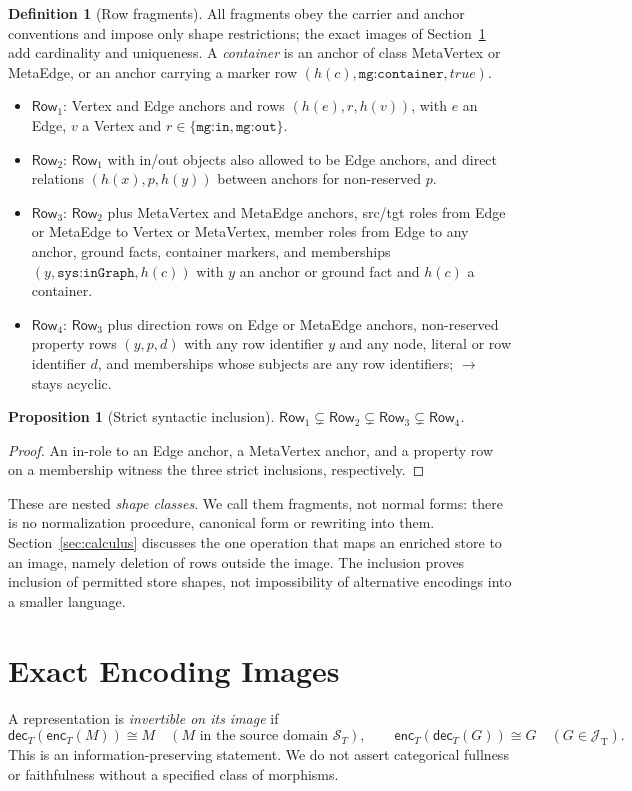 \documentclass[11pt]{article}
\theoremstyle{plain}
\newtheorem{proposition}[theorem]{Proposition}
\theoremstyle{definition}
\newtheorem{definition}{Definition}
\theoremstyle{remark}
\newcommand{\enc}{\mathsf{enc}}
\newcommand{\dec}{\mathsf{dec}}
\newcommand{\mg}[1]{\texttt{mg:#1}}
\newcommand{\sys}[1]{\texttt{sys:#1}}
\newcommand{\NF}[1]{\mathsf{Row}_{#1}}
\newcommand{\Img}[1]{\mathcal J_{\mathrm{#1}}}
\begin{document}
\begin{definition}[Row fragments]\label{def:nf}
All fragments obey the carrier and anchor conventions and impose only shape
restrictions; the exact images of Section~\ref{sec:embed} add cardinality and uniqueness.
A \emph{container} is an anchor of class MetaVertex or MetaEdge, or an anchor carrying a
marker row $(h(c),\mg{container},\mathit{true})$.
\begin{itemize}
\item $\NF1$: Vertex and Edge anchors and rows $(h(e),r,h(v))$, with $e$ an Edge, $v$ a
Vertex and $r\in\{\mg{in},\mg{out}\}$.
\item $\NF2$: $\NF1$ with in/out objects also allowed to be Edge anchors, and direct
relations $(h(x),p,h(y))$ between anchors for non-reserved $p$.
\item $\NF3$: $\NF2$ plus MetaVertex and MetaEdge anchors, src/tgt roles from Edge or
MetaEdge to Vertex or MetaVertex, member roles from Edge to any anchor, ground facts,
container markers, and memberships $(y,\sys{inGraph},h(c))$ with $y$ an anchor or ground
fact and $h(c)$ a container.
\item $\NF4$: $\NF3$ plus direction rows on Edge or MetaEdge anchors, non-reserved
property rows $(y,p,d)$ with any row identifier $y$ and any node, literal or row
identifier $d$, and memberships whose subjects are any row identifiers; $\to$ stays
acyclic.
\end{itemize}
\end{definition}
\begin{proposition}[Strict syntactic inclusion]
$\NF1\subsetneq\NF2\subsetneq\NF3\subsetneq\NF4$.
\end{proposition}
\begin{proof}
An in-role to an Edge anchor, a MetaVertex anchor, and a property row on a membership
witness the three strict inclusions, respectively.
\end{proof}
These are nested \emph{shape classes}. We call them fragments, not normal forms: there is
no normalization procedure, canonical form or rewriting into them. Section~\ref{sec:calculus}
discusses the one operation that maps an enriched store to an image, namely deletion of
rows outside the image. The inclusion proves inclusion of permitted store shapes, not
impossibility of alternative encodings into a smaller language.

\section{Exact Encoding Images}\label{sec:embed}
A representation is \emph{invertible on its image} if
\[
\dec_T(\enc_T(M))\cong M\quad(M\text{ in the source domain }\mathcal S_T),\qquad
\enc_T(\dec_T(G))\cong G\quad(G\in\Img{T}).
\]
This is an information-preserving statement. We do not assert categorical fullness or
faithfulness without a specified class of morphisms.
\end{document}

